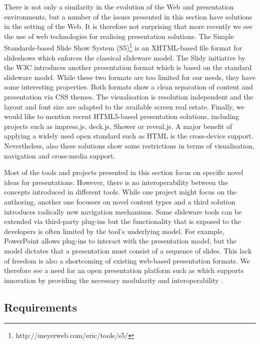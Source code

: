     There is not only a similarity in the evolution of the Web and presentation
    environments, but a number of the issues presented in this section have
    solutions in the setting of the Web. It is therefore not surprising that
    more recently we see the use of web technologies for realising presentation
    solutions. The Simple Standards-based Slide Show System
    (S5)\footnote{http://meyerweb.com/eric/tools/s5/} is an XHTML-based file
    format for slideshows which enforces the classical slideware model. The
    Slidy \citep{raggett-1} initiative by the W3C introduces another
    presentation format which is based on the standard slideware model. While
    these two formats are too limited for our needs, they have some interesting
    properties. Both formats show a clean separation of content and
    presentation via CSS themes. The visualisation is resolution independent
    and the layout and font size are adapted to the available screen real
    estate. Finally, we would like to mention recent HTML5-based presentation
    solutions, including projects such as impress.js, deck.js, Shower or
    reveal.js. A major benefit of applying a widely used open standard such as
    HTML is the cross-device support. Nevertheless, also these solutions show
    some restrictions in terms of visualisation, navigation and cross-media
    support.

    Most of the tools and projects presented in this section focus on specific
    novel ideas for presentations. However, there is no interoperability
    between the concepts introduced in different tools. While one project might
    focus on the authoring, another one focusses on novel content types and a
    third solution introduces radically new navigation mechanisms. Some
    slideware tools can be extended via third-party plug-ins but the
    functionality that is exposed to the developers is often limited by the
    tool's underlying model. For example, PowerPoint allows plug-ins to
    interact with the presentation model, but the model dictates that a
    presentation must consist of a sequence of slides. This lack of freedom is
    also a shortcoming of existing web-based presentation formats. We therefore
    see a need for an open presentation platform such as \mxp which supports
    innovation by providing the necessary modularity and interoperability
    \citep{bush-1}.

   \subsection{Requirements}

